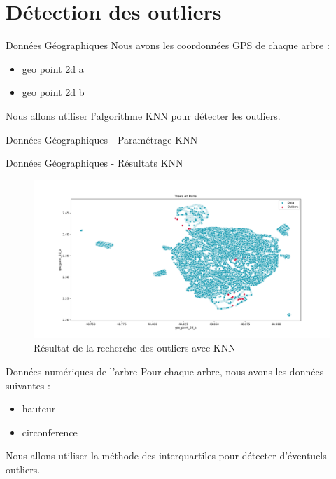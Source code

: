 \documentclass{beamer}
\begin{document}
\section{Détection des outliers}
\begin{frame}{Données Géographiques}
	Nous avons les coordonnées GPS de chaque arbre :
	\begin{itemize}
		\item geo point 2d a
		\item geo point 2d b
	\end{itemize}
	Nous allons utiliser l'algorithme KNN pour détecter les outliers.
\end{frame}

\begin{frame}{Données Géographiques - Paramétrage KNN}

\end{frame}

\begin{frame}{Données Géographiques -  Résultats KNN}
	\begin{figure}
		\includegraphics[width=\textwidth,keepaspectratio]{ressources/knn_outliers.png}
			\caption{Résultat de la recherche des outliers avec KNN}
	\end{figure}
\end{frame}

\begin{frame}{Données numériques de l'arbre}
	Pour chaque arbre, nous avons les données suivantes :
	\begin{itemize}
		\item hauteur
		\item circonference
	\end{itemize}
	Nous allons utiliser la méthode des interquartiles pour détecter d'éventuels outliers.
\end{frame}
\end{document}
